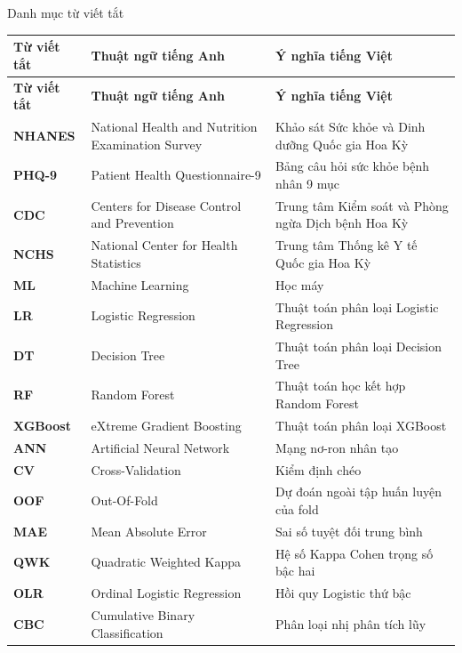 \documentclass{uetgraduation}
\begin{document}
\begin{contentlisting}
\tableofcontents
\listoffigures
\listoftables

\begin{contentlistingsection}{Danh mục từ viết tắt}
\setlength{\tabcolsep}{4pt}
\begin{longtable}{p{2.0cm} p{6.4cm} p{6.4cm}}
\toprule
\textbf{Từ viết tắt} & \textbf{Thuật ngữ tiếng Anh} & \textbf{Ý nghĩa tiếng Việt} \\
\midrule
\endfirsthead
\toprule
\textbf{Từ viết tắt} & \textbf{Thuật ngữ tiếng Anh} & \textbf{Ý nghĩa tiếng Việt} \\
\midrule
\endhead
\bottomrule
\endfoot
\textbf{NHANES} & National Health and Nutrition Examination Survey & Khảo sát Sức khỏe và Dinh dưỡng Quốc gia Hoa Kỳ \\
\textbf{PHQ-9}  & Patient Health Questionnaire-9 & Bảng câu hỏi sức khỏe bệnh nhân 9 mục \\
\textbf{CDC}    & Centers for Disease Control and Prevention & Trung tâm Kiểm soát và Phòng ngừa Dịch bệnh Hoa Kỳ \\
\textbf{NCHS}   & National Center for Health Statistics & Trung tâm Thống kê Y tế Quốc gia Hoa Kỳ \\
\textbf{ML}     & Machine Learning & Học máy \\
\textbf{LR}     & Logistic Regression & Thuật toán phân loại Logistic Regression \\
\textbf{DT}     & Decision Tree & Thuật toán phân loại Decision Tree \\
\textbf{RF}     & Random Forest & Thuật toán học kết hợp Random Forest \\
\textbf{XGBoost}& eXtreme Gradient Boosting & Thuật toán phân loại XGBoost \\
\textbf{ANN}    & Artificial Neural Network & Mạng nơ-ron nhân tạo \\
\textbf{CV}     & Cross-Validation & Kiểm định chéo \\
\textbf{OOF}    & Out-Of-Fold & Dự đoán ngoài tập huấn luyện của fold \\
\textbf{MAE}    & Mean Absolute Error & Sai số tuyệt đối trung bình \\
\textbf{QWK}    & Quadratic Weighted Kappa & Hệ số Kappa Cohen trọng số bậc hai \\
\textbf{OLR}    & Ordinal Logistic Regression & Hồi quy Logistic thứ bậc \\
\textbf{CBC}    & Cumulative Binary Classification & Phân loại nhị phân tích lũy \\

\end{longtable}
\end{contentlistingsection}
\end{contentlisting}
\end{document}
